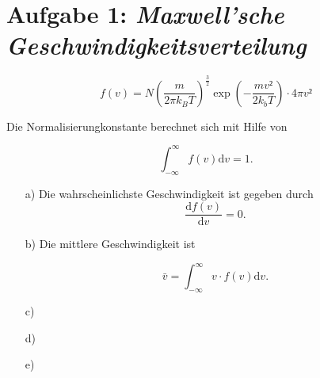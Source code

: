  
\section*{Aufgabe 1: \emph{Maxwell'sche Geschwindigkeitsverteilung}}

\begin{equation}
f(v)=N\left(\frac{m}{2\pi k_BT}\right)^\frac{3}{2}\exp{\left(-\frac{mv²}{2k_bT}\right)}\cdot4\pi v²
\end{equation}

Die Normalisierungkonstante berechnet sich mit Hilfe von

\begin{equation}
\int_{-\infty}^\infty f(v)\text{d}v=1.
\end{equation}

\begin{itemize}
\item[a)] Die wahrscheinlichste Geschwindigkeit ist gegeben durch
\begin{equation}
\frac{\text{d}f(v)}{\text{d}v}=0.
\end{equation}

\item[b)] Die mittlere Geschwindigkeit ist 

\begin{equation}
\bar{v}=\int_{-\infty}^\infty v\cdot f(v)\text{d}v.
\end{equation}



\item[c)]
\item[d)]
\item[e)]
\end{itemize}
